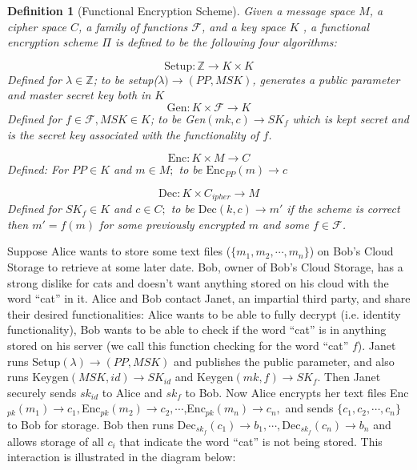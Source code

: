 \documentclass[12pt,twoside]{reedthesis}
\newtheorem{definition}{Definition}
\newcommand{\enc}[0]{\text{Enc}}
\newcommand{\dec}[0]{\text{Dec}}
\newcommand{\Z}[0]{\mathbb{Z}}
\begin{document}
\begin{definition}[Functional Encryption Scheme]
Given a message space $M$, a cipher space $C$, a family of functions $\mathcal{F}$, and a key space $K$ , a functional encryption scheme $\Pi$ is defined to be the following four algorithms:

$$\text{Setup}: \Z \rightarrow K \times K$$
Defined for $\lambda \in \Z$; to be setup($\lambda) \rightarrow (PP,MSK)$, generates a public parameter and master secret key both in $K$
$$\text{Gen}: K \times \mathcal{F} \rightarrow K $$
Defined for $f \in \mathcal{F}, MSK \in K$; to be Gen$(mk,c) \rightarrow SK_f$ which is kept secret and is the secret key associated with the functionality of $f$.

$$\enc: K \times M \rightarrow C$$
Defined: For $PP\in K$ and $m \in M;$ to be $\enc_{PP}(m) \rightarrow c$

$$\dec:K \times C_{ipher} \rightarrow M$$
Defined for $SK_f \in K$ and $c \in C;$ to be $\dec(k,c) \rightarrow m'$ if the scheme is correct then $m' = f(m)$ for some previously encrypted $m$ and some $f\in \mathcal{F}$.

\end{definition}



\par Suppose Alice wants to store some text files ($\{m_1,m_2,\cdots, m_n \}$) on Bob's Cloud Storage to retrieve at some later date.
 Bob, owner of Bob's Cloud Storage, has a strong dislike for cats and doesn't want anything stored on
  his cloud with the word ``cat'' in it. Alice and Bob contact Janet, an impartial third party, and share their desired functionalities: Alice wants to be able to fully decrypt (i.e. identity functionality), Bob wants to be able to check if the word ``cat'' is in anything stored on his server (we call this function checking for the word ``cat'' $f$). Janet runs Setup$(\lambda)\rightarrow (PP, MSK)$ and publishes the public parameter, and also runs Keygen$(MSK,id) \rightarrow SK_{id}$ and Keygen$(mk,f) \rightarrow SK_f$. Then Janet securely sends $sk_{id}$ to Alice and $sk_{f}$ to Bob. Now Alice encrypts her text files Enc$_{pk}(m_1) \rightarrow c_1,$Enc$_{pk}(m_2) \rightarrow c_2, \cdots $,Enc$_{pk}(m_n) \rightarrow c_n,$ and sends $\{c_1,c_2, \cdots, c_n \}$ to Bob for storage. Bob then runs $\dec_{sk_f}(c_1) \rightarrow b_1 , \cdots, \dec_{sk_f}(c_n) \rightarrow b_n $ and allows storage of all $c_i$ that indicate the word ``cat'' is not being stored.  This interaction is illustrated in the diagram below:
  
\end{document}
